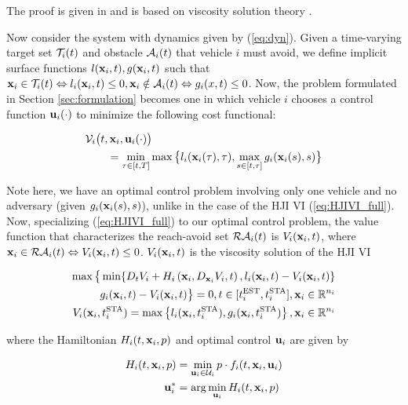 The proof is given in \cite{fisac15} and is based on viscosity solution theory \cite{evans84, barron90}.

Now consider the system with dynamics given by (\ref{eq:dyn}). Given a time-varying target set $\mathcal{T}_i(t)$ and obstacle $\mathcal{A}_i(t)$ that vehicle $i$ must avoid, we define implicit surface functions $l(\mathbf{x}_i,t), g(\mathbf{x}_i,t)$ such that $\mathbf{x}_i\in\mathcal{T}_i(t)\Leftrightarrow l_i(\mathbf{x}_i,t)\le 0,\mathbf{x}_i\notin \mathcal{A}_i(t) \Leftrightarrow g_i(x,t)\le 0$. Now, the problem formulated in Section \ref{sec:formulation} becomes one in which vehicle $i$ chooses a control function $\mathbf{u}_i(\cdot)$ to minimize the following cost functional:

\begin{equation}
\label{eq:cost}
\begin{aligned}
&\mathcal{V}_i\big(t,\mathbf{x}_i, \mathbf{u}_i(\cdot)\big) \\
&\qquad= \min_{\tau\in[t,T]}\max\big\{l_i(\mathbf{x}_i(\tau),\tau),\max_{s\in[t,\tau]} g_i(\mathbf{x}_i(s),s)\big\}
\end{aligned}
\end{equation}

Note here, we have an optimal control problem involving only one vehicle and no adversary (given $g_i(\mathbf{x}_i(s),s)$), unlike in the case of the HJI VI (\ref{eq:HJIVI_full}). Now, specializing (\ref{eq:HJIVI_full}) to our optimal control problem, the value function that characterizes the reach-avoid set $\mathcal{RA}_i(t)$ is $V_i(\mathbf{x}_i, t)$, where $\mathbf{x}_i \in \mathcal{RA}_i(t) \Leftrightarrow V_i(\mathbf{x}_i, t) \le 0$. $V_i(\mathbf{x}_i, t)$ is the viscosity solution \cite{crandall84} of the HJI VI

\begin{equation}
\label{eq:HJI}
\begin{aligned}
\max\big\{\min\{D_t V_i + H_i\left(\mathbf{x}_i, D_{\mathbf{x}_i} V_i,t\right),l_i(\mathbf{x}_i,t)-V_i(\mathbf{x}_i, t)\}\\
\quad g_i(\mathbf{x}_i,t)-V_i(\mathbf{x}_i,t)\big\}=0, t\in[t^{\text{EST}}_i,t^{\text{STA}}_i], \mathbf{x}_i\in\mathbb{R}^{n_i}\\
V_i(\mathbf{x}_i,t^{\text{STA}}_i) = \max\left\{l_i(\mathbf{x}_i,t^{\text{STA}}_i),g_i(\mathbf{x}_i,t^{\text{STA}}_i)\right\}, \mathbf{x}_i\in\mathbb{R}^{n_i}
\end{aligned}
\end{equation}

\noindent where the Hamiltonian $H_i(t, \mathbf{x}_i, p)$ and optimal control $\mathbf{u}_i$ are given by

\begin{equation}
\begin{aligned}
H_i(t,\mathbf{x}_i,p) &= \min_{\mathbf{u}_i\in\mathcal{U}_i} p \cdot f_i(t,\mathbf{x}_i,\mathbf{u}_i) \\
\mathbf{u}^*_i &= \arg \min_{\mathbf{u}_i} H_i(t,\mathbf{x}_i,p)
\end{aligned}
\end{equation}

